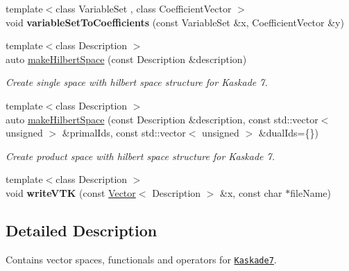 \begin{DoxyCompactItemize}
\item 
\hypertarget{namespaceSpacy_1_1Kaskade_aa69d49f1744cff3e4bd945d292e32018}{{\footnotesize template$<$class Variable\-Set , class Coefficient\-Vector $>$ }\\void {\bfseries variable\-Set\-To\-Coefficients} (const \-Variable\-Set \&x, \-Coefficient\-Vector \&y)}\label{namespaceSpacy_1_1Kaskade_aa69d49f1744cff3e4bd945d292e32018}

\item 
{\footnotesize template$<$class Description $>$ }\\auto \hyperlink{group__VectorSpaceGroup_ga04d45446864bbf87770d02eade7b64cf}{make\-Hilbert\-Space} (const \-Description \&description)
\begin{DoxyCompactList}\small\item\em \-Create single space with hilbert space structure for \-Kaskade 7. \end{DoxyCompactList}\item 
{\footnotesize template$<$class Description $>$ }\\auto \hyperlink{group__VectorSpaceGroup_ga221db25c41371a2a823a6b569d735ef6}{make\-Hilbert\-Space} (const \-Description \&description, const std\-::vector$<$ unsigned $>$ \&primal\-Ids, const std\-::vector$<$ unsigned $>$ \&dual\-Ids=\{\})
\begin{DoxyCompactList}\small\item\em \-Create product space with hilbert space structure for \-Kaskade 7. \end{DoxyCompactList}\item 
\hypertarget{namespaceSpacy_1_1Kaskade_ab5f26938161de79afaba223ca4a5dfa8}{{\footnotesize template$<$class Description $>$ }\\void {\bfseries write\-V\-T\-K} (const \hyperlink{classSpacy_1_1Kaskade_1_1Vector}{\-Vector}$<$ \-Description $>$ \&x, const char $\ast$file\-Name)}\label{namespaceSpacy_1_1Kaskade_ab5f26938161de79afaba223ca4a5dfa8}

\end{DoxyCompactItemize}


\subsection{\-Detailed \-Description}
\-Contains vector spaces, functionals and operators for \href{http://www.zib.de/projects/kaskade7-finite-element-toolbox}{\tt \-Kaskade7}. 

